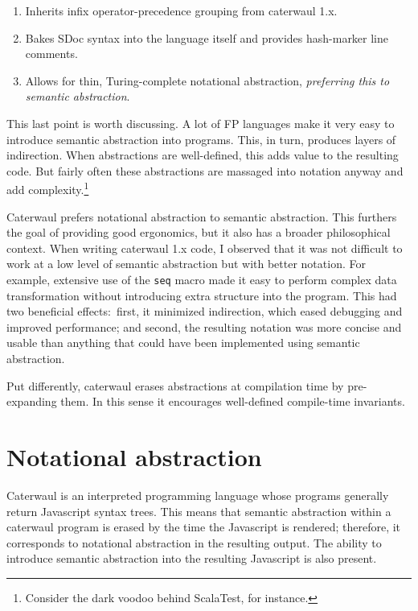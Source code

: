 \documentclass{report}
\begin{document}
\begin{enumerate}
\item{Inherits infix operator-precedence grouping from caterwaul 1.x.}
\item{Bakes SDoc syntax into the language itself and provides hash-marker line comments.}
\item{Allows for thin, Turing-complete notational abstraction, {\em preferring this to semantic abstraction}.}
\end{enumerate}

    This last point is worth discussing. A lot of FP languages make it very easy to introduce semantic abstraction into programs. This, in turn, produces layers of indirection. When
    abstractions are well-defined, this adds value to the resulting code. But fairly often these abstractions are massaged into notation anyway and add complexity.\footnote{Consider the dark
    voodoo behind ScalaTest, for instance.}

    Caterwaul prefers notational abstraction to semantic abstraction. This furthers the goal of providing good ergonomics, but it also has a broader philosophical context. When writing
    caterwaul 1.x code, I observed that it was not difficult to work at a low level of semantic abstraction but with better notation. For example, extensive use of the {\tt seq} macro made it
    easy to perform complex data transformation without introducing extra structure into the program. This had two beneficial effects:~first, it minimized indirection, which eased debugging
    and improved performance; and second, the resulting notation was more concise and usable than anything that could have been implemented using semantic abstraction.

    Put differently, caterwaul erases abstractions at compilation time by pre-expanding them. In this sense it encourages well-defined compile-time invariants.

\chapter{Notational abstraction}
  Caterwaul is an interpreted programming language whose programs generally return Javascript syntax trees. This means that semantic abstraction within a caterwaul program is erased by the
  time the Javascript is rendered; therefore, it corresponds to notational abstraction in the resulting output. The ability to introduce semantic abstraction into the resulting Javascript is
  also present.
\end{document}
